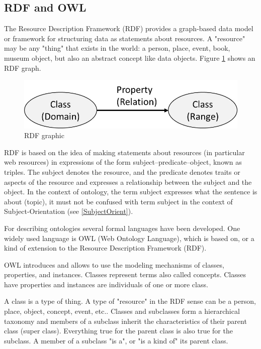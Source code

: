 \subsection{RDF and OWL}

The Resource Description Framework (RDF)\cite{rdf:rdf} provides a graph-based data model or framework for structuring data as statements about resources. A "resource" may be any "thing" that exists in the world: a person, place, event, book, museum object, but also an abstract concept like data objects. Figure \ref{fig:classes-properties}  shows an RDF graph.

\begin{figure}[h]
	\centering
	\includegraphics[width=0.6\linewidth]{Figures/Ontology/Introduction/Classes-Properties}
	\caption[RDF graphic]{RDF graphic}
	\label{fig:classes-properties}
\end{figure}

RDF is based on the idea of making statements about resources (in particular web resources) in expressions of the form subject–predicate–object, known as triples. The subject denotes the resource, and the predicate denotes traits or aspects of the resource and expresses a relationship between the subject and the object. In the context of ontology, the term subject expresses what the sentence is about (topic), it must not be confused with term subject in the context of Subject-Orientation (see \ref{SubjectOrient}).

For describing ontologies several formal languages have been developed. One widely used language is OWL (Web Ontology Language)\cite{w3c:owl}, which is based on, or a kind of extension to the Resource Description Framework (RDF).

OWL introduces and allows to use the modeling mechanisms of classes, properties, and instances. Classes represent terms also called concepts. Classes have properties and instances are individuals of one or more class.

A class is a type of thing. A type of "resource" in the RDF sense can be a person, place, object, concept, event, etc.. Classes and subclasses form a hierarchical taxonomy and members of a subclass inherit the characteristics of their parent class (super class). Everything true for the parent class is also true for the subclass. A member of a subclass "is a", or "is a kind of" its parent class.

